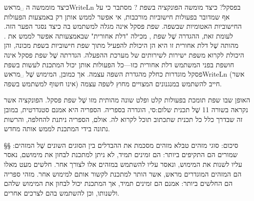 כיצד מוממשה ה ␣מראש{WriteLn} בפסקל? כיצד מומשה הפונקציה
 בשפת ? מסתבר כי על אף שמדובר בפעולות חישוביות מורכבות, אי אפשר
    לממש אותן רק באמצעות הפעולות החישוביות האטומיות שבשפה. שפת פסקל אינה מגלה
    למשתמש בה כיצד נסגר הפער הזה. לעומת זאת, ההגדרה שֶׁל שפת , מכילה "דלת אחורית"
    שבאמצעותה אפשר לממש את . מהותה שֶׁל דלת אחורית זו היא הן היכולת להפעיל
    מתוך שפת   חישוביות בשפת מכונה, והן היכולת לקרוא משפת  ישירות
    לשירותים של מערכת ההפעלה. הגדרתה שֶׁל שפת פסקל אינה חושפת בפני
    המשתמש דלת אחורית כזו---כל הפעולות אותן יכול המתכנת לעשות בשפת פסקל
    מוגדרות כחלק מהגדרת השפה עצמה. אך כמובן, המימוש שֶׁל ␣מראש{WriteLn} (אשר אינו
    חשוף למשתמש בשפה) חייב להשתמש במנגנונים המצויים מחוץ לשפה עצמה.

    האופן שבו שפת  תומכת בפעולות קלט ופלט שונה מהותית מזו שֶׁל שפת פסקל. הפונקציה
     אשר נקראה בשורה 11 שֶׁל  תכנית שלום:סי, הוגדרה בספריה. הספריה היא
    אמנם סטנדרטית, במובן זה שבדרך כלל כל תכנית  שתכתוב תוכל לקרוא לה. אולם,
    הספריה ניתנת להחלפה, והרשות נתונה בידי המתכנת לממש אותה מחדש.

    §§ סיכום: סוגי מזהים
     טבלא מזהים מסכמת את ההבדלים בין הסוגים השונים שֶׁל המזהים:  שמורים הם
    התקיפים ביותר: הם זמינים תמיד, לא ניתן למתכנת לבחון את מימושם, נאסר עליו לשנות
    את המימוש, ונאסר עליו להשתמש במזהים אלו לצורך אחר. חלשים מעט מאלו הם המזהים
    המוגדרים מראש, אשר הותר למתכנת לקשור אותם למימוש אחר. מזהי ספריה הם החלשים
    ביותר: אמנם הם זמינים תמיד, אך המתכנת יכול לבחון את המימוש שלהם ולשנותו, וכן
    להשתמש בהם לצרכים אחרים.

